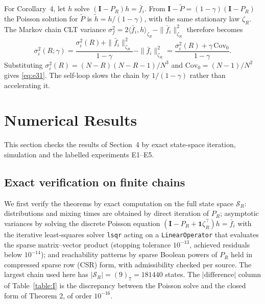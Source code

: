 \documentclass[twoside,11pt]{article}
\begin{document}
For Corollary~4, let $h$ solve $(\mathbf{I}-P_R)h=\bar f_i$. From
$\mathbf{I}-\widetilde P=(1-\gamma)(\mathbf{I}-P_R)$ the Poisson solution for
$\widetilde P$ is $\widetilde h=h/(1-\gamma)$, with the same stationary law
$\zeta_R$. The Markov chain CLT variance
$\sigma_f^{2}=2\langle\bar f_i,h\rangle_{\zeta_R}-\|\bar f_i\|_{\zeta_R}^{2}$
therefore becomes
\begin{equation}\label{eq:e46}
\sigma_i^{2}(R;\gamma) =\dfrac{\sigma_i^{2}(R)+\|\bar f_i\|_{\zeta_R}^{2}}{1-\gamma} -\|\bar f_i\|_{\zeta_R}^{2} =\dfrac{\sigma_i^{2}(R)+\gamma\,\mathrm{Cov}_0}{1-\gamma}.
\end{equation}
Substituting $\sigma_i^{2}(R)=(N-R)(N-R-1)/N^{3}$ and
$\mathrm{Cov}_0=(N-1)/N^{2}$ gives \eqref{eq:e31}. The self-loop slows the chain by
$1/(1-\gamma)$ rather than accelerating it.

\section{Numerical Results}
This section checks the results of Section~4 by exact state-space
iteration, simulation and the labelled experiments E1--E5.
\subsection{Exact verification on finite chains}
We first verify the theorems by exact computation on the full state space $\mathcal{S}_R$: distributions and mixing times are obtained by direct iteration of $P_R$; asymptotic variances by solving the discrete Poisson equation \citep{ref4} $(\mathbf{I}-P_R+\mathbf{1}\zeta_R^{\top})h=\bar f_i$ with the iterative least-squares solver \texttt{lsqr} acting on a \texttt{LinearOperator} that evaluates the sparse matrix--vector product (stopping tolerance $10^{-13}$, achieved residuals below $10^{-14}$); and reachability patterns by sparse Boolean powers of $P_R$ held in compressed sparse row (CSR) form, with admissibility checked per source. The largest chain used here has $|\mathcal{S}_R|=(9)_7=181440$ states. The $|\mathrm{difference}|$ column of Table~\ref{table:I} is the discrepancy between the Poisson solve and the closed form of Theorem 2, of order $10^{-16}$.
\end{document}
